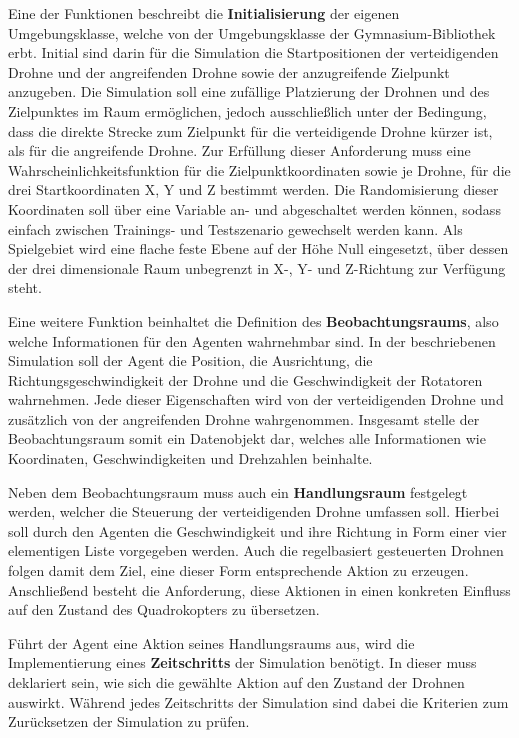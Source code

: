 Eine der Funktionen beschreibt die \textbf{Initialisierung} der eigenen Umgebungsklasse, welche von der Umgebungsklasse der Gymnasium-Bibliothek erbt.
Initial sind darin für die Simulation die Startpositionen der verteidigenden Drohne und der angreifenden Drohne sowie der anzugreifende Zielpunkt anzugeben.
Die Simulation soll eine zufällige Platzierung der Drohnen und des Zielpunktes im Raum ermöglichen, jedoch ausschließlich unter der Bedingung, dass die direkte Strecke zum Zielpunkt für die verteidigende Drohne kürzer ist, als für die angreifende Drohne.
Zur Erfüllung dieser Anforderung muss eine Wahrscheinlichkeitsfunktion für die Zielpunktkoordinaten sowie je Drohne, für die drei Startkoordinaten X, Y und Z bestimmt werden.
Die Randomisierung dieser Koordinaten soll über eine Variable an- und abgeschaltet werden können, sodass einfach zwischen Trainings- und Testszenario gewechselt werden kann.
Als Spielgebiet wird eine flache feste Ebene auf der Höhe Null eingesetzt, über dessen der drei dimensionale Raum unbegrenzt in X-, Y- und Z-Richtung zur Verfügung steht.

Eine weitere Funktion beinhaltet die Definition des \textbf{Beobachtungsraums}, also welche Informationen für den Agenten wahrnehmbar sind. 
In der beschriebenen Simulation soll der Agent die Position, die Ausrichtung, die Richtungsgeschwindigkeit der Drohne und die Geschwindigkeit der Rotatoren wahrnehmen. %
Jede dieser Eigenschaften wird von der verteidigenden Drohne und zusätzlich von der angreifenden Drohne wahrgenommen. 
Insgesamt stelle der Beobachtungsraum somit ein Datenobjekt dar, welches alle Informationen wie Koordinaten, Geschwindigkeiten und Drehzahlen beinhalte.

Neben dem Beobachtungsraum muss auch ein \textbf{Handlungsraum} festgelegt werden, welcher die Steuerung der verteidigenden Drohne umfassen soll.
Hierbei soll durch den Agenten die Geschwindigkeit und ihre Richtung in Form einer vier elementigen Liste vorgegeben werden.
Auch die regelbasiert gesteuerten Drohnen folgen damit dem Ziel, eine dieser Form entsprechende Aktion zu erzeugen. %
Anschließend besteht die Anforderung, diese Aktionen in einen konkreten Einfluss auf den Zustand des Quadrokopters zu übersetzen.

Führt der Agent eine Aktion seines Handlungsraums aus, wird die Implementierung eines \textbf{Zeitschritts} der Simulation benötigt.
In dieser muss deklariert sein, wie sich die gewählte Aktion auf den Zustand der Drohnen auswirkt.
Während jedes Zeitschritts der Simulation sind dabei die Kriterien zum Zurücksetzen der Simulation zu prüfen.

